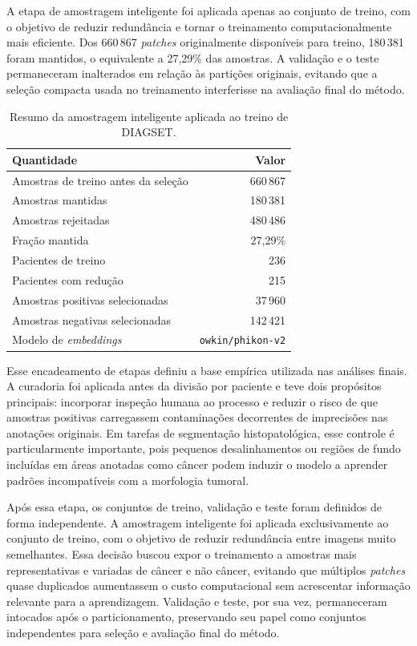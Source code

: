 A etapa de amostragem inteligente foi aplicada apenas ao conjunto de treino, com o objetivo de reduzir redundância e tornar o treinamento computacionalmente mais eficiente. Dos 660\,867 \textit{patches} originalmente disponíveis para treino, 180\,381 foram mantidos, o equivalente a 27{,}29\% das amostras. A validação e o teste permaneceram inalterados em relação às partições originais, evitando que a seleção compacta usada no treinamento interferisse na avaliação final do método.

\begin{table}[!htb]
\centering
\caption{Resumo da amostragem inteligente aplicada ao treino de DIAGSET.}
\label{tab:results_diagset-smart-sampling}
\small
\begin{tabular}{lr}
\toprule
Quantidade & Valor \\
\midrule
Amostras de treino antes da seleção & 660\,867 \\
Amostras mantidas & 180\,381 \\
Amostras rejeitadas & 480\,486 \\
Fração mantida & 27{,}29\% \\
Pacientes de treino & 236 \\
Pacientes com redução & 215 \\
Amostras positivas selecionadas & 37\,960 \\
Amostras negativas selecionadas & 142\,421 \\
Modelo de \textit{embeddings} & \texttt{owkin/phikon-v2} \\
\bottomrule
\end{tabular}
\end{table}

Esse encadeamento de etapas definiu a base empírica utilizada nas análises finais. A curadoria foi aplicada antes da divisão por paciente e teve dois propósitos principais: incorporar inspeção humana ao processo e reduzir o risco de que amostras positivas carregassem contaminações decorrentes de imprecisões nas anotações originais. Em tarefas de segmentação histopatológica, esse controle é particularmente importante, pois pequenos desalinhamentos ou regiões de fundo incluídas em áreas anotadas como câncer podem induzir o modelo a aprender padrões incompatíveis com a morfologia tumoral.

Após essa etapa, os conjuntos de treino, validação e teste foram definidos de forma independente. A amostragem inteligente foi aplicada exclusivamente ao conjunto de treino, com o objetivo de reduzir redundância entre imagens muito semelhantes. Essa decisão buscou expor o treinamento a amostras mais representativas e variadas de câncer e não câncer, evitando que múltiplos \textit{patches} quase duplicados aumentassem o custo computacional sem acrescentar informação relevante para a aprendizagem. Validação e teste, por sua vez, permaneceram intocados após o particionamento, preservando seu papel como conjuntos independentes para seleção e avaliação final do método.


